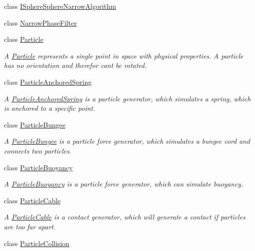 \begin{DoxyCompactItemize}
class \mbox{\hyperlink{classr3_1_1_i_sphere_sphere_narrow_algorithm}{I\+Sphere\+Sphere\+Narrow\+Algorithm}}
\item 
class \mbox{\hyperlink{classr3_1_1_narrow_phase_filter}{Narrow\+Phase\+Filter}}
\item 
class \mbox{\hyperlink{classr3_1_1_particle}{Particle}}
\begin{DoxyCompactList}\small\item\em A \mbox{\hyperlink{classr3_1_1_particle}{Particle}} represents a single point in space with physical properties. A particle has no orientation and therefor can\textquotesingle{}t be rotated. \end{DoxyCompactList}\item 
class \mbox{\hyperlink{classr3_1_1_particle_anchored_spring}{Particle\+Anchored\+Spring}}
\begin{DoxyCompactList}\small\item\em A \mbox{\hyperlink{classr3_1_1_particle_anchored_spring}{Particle\+Anchored\+Spring}} is a particle generator, which simulates a spring, which is anchored to a specific point. \end{DoxyCompactList}\item 
class \mbox{\hyperlink{classr3_1_1_particle_bungee}{Particle\+Bungee}}
\begin{DoxyCompactList}\small\item\em A \mbox{\hyperlink{classr3_1_1_particle_bungee}{Particle\+Bungee}} is a particle force generator, which simulates a bungee cord and connects two particles. \end{DoxyCompactList}\item 
class \mbox{\hyperlink{classr3_1_1_particle_buoyancy}{Particle\+Buoyancy}}
\begin{DoxyCompactList}\small\item\em A \mbox{\hyperlink{classr3_1_1_particle_buoyancy}{Particle\+Buoyancy}} is a particle force generator, which can simulate buoyancy. \end{DoxyCompactList}\item 
class \mbox{\hyperlink{classr3_1_1_particle_cable}{Particle\+Cable}}
\begin{DoxyCompactList}\small\item\em A \mbox{\hyperlink{classr3_1_1_particle_cable}{Particle\+Cable}} is a contact generator, which will generate a contact if particles are too far apart. \end{DoxyCompactList}\item 
class \mbox{\hyperlink{classr3_1_1_particle_collision}{Particle\+Collision}}

\end{DoxyCompactItemize}
